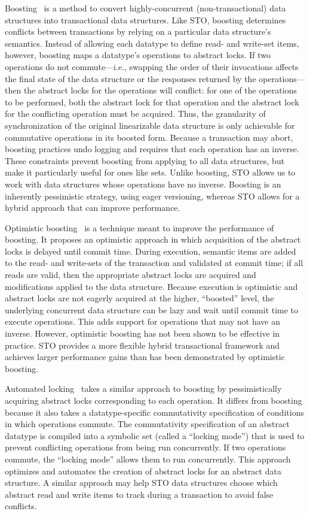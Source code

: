 Boosting~\cite{boost} is a method to convert highly-concurrent (non-transactional) data structures into transactional data structures. Like STO, boosting determines conflicts between transactions by relying on a particular data structure's semantics. Instead of allowing each datatype to define read- and write-set items, however, boosting maps a datatype's operations to abstract locks. If two operations do not commute---i.e., swapping the order of their invocations affects the final state of the data structure or the responses returned by the operations---then the abstract locks for the operations will conflict: for one of the operations to be performed, both the abstract lock for that operation and the abstract lock for the conflicting operation must be acquired.
Thus, the granularity of synchronization of the original linearizable data structure is only achievable for commutative operations in its boosted form. Because a transaction may abort, boosting practices undo logging and requires that each operation has an inverse. These constraints prevent boosting from applying to all data structures, but make it particularly useful for ones like sets. Unlike boosting, STO allows us to work with data structures whose operations have no inverse. Boosting is an inherently pessimistic strategy, using eager versioning, whereas STO allows for a hybrid approach that can improve performance.

Optimistic boosting~\cite{optboost} is a technique meant to improve the performance of boosting. It proposes an optimistic approach in which acquisition of the abstract locks is delayed until commit time. During execution, semantic items are added to the read- and write-sets of the transaction and validated at commit time; if all reads are valid, then the appropriate abstract locks are acquired and modifications applied to the data structure. Because execution is optimistic and abstract locks are not eagerly acquired at the higher, ``boosted'' level, the underlying concurrent data structure can be lazy and wait until commit time to execute operations. This adds support for operations that may not have an inverse. 
However, optimistic boosting has not been shown to be effective in practice. STO provides a more flexible hybrid transactional framework and achieves larger performance gains than has been demonstrated by optimistic boosting.

Automated locking~\cite{autolock} takes a similar approach to boosting by pessimistically acquiring abstract locks corresponding to each operation. It differs from boosting because it also takes a datatype-specific commutativity specification of conditions in which operations commute. The commutativity specification of an abstract datatype is compiled into a symbolic set (called a ``locking mode'') that is used to prevent conflicting operations from being run concurrently. If two operations commute, the ``locking mode'' allows them to run concurrently.
This approach optimizes and automates the creation of abstract locks for an abstract data structure. A similar approach may help STO data structures choose which abstract read and write items to track during a transaction to avoid false conflicts.

